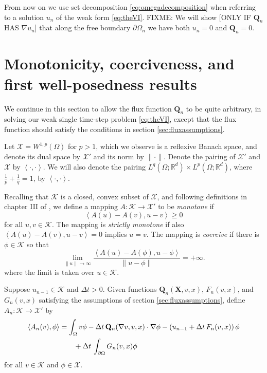 \documentclass[final,leqno,onefignum,onetabnum]{siamltex1213bueler}
\newcommand\bQ{\mathbf{Q}}
\newcommand\bX{\mathbf{X}}
\renewcommand{\grad}{\nabla}
\newcommand{\ip}[2]{\ensuremath{\left<#1,#2\right>}}
\newcommand\RR{\mathbb{R}}
\begin{document}
\medskip
From now on we use set decomposition \eqref{eq:omegadecomposition} when referring to a solution $u_n$ of the weak form \eqref{eq:theVI}.  FIXME:  We will show [ONLY IF $\bQ_n$ HAS $\grad u_n$] that along the free boundary $\partial\Omega_n$ we have both $u_n=0$ and $\bQ_n = 0$.


\section{Monotonicity, coerciveness, and first well-posedness results} \label{sec:mono}

We continue in this section to allow the flux function $\bQ_n$ to be quite arbitrary, in solving our weak single time-step problem \eqref{eq:theVI}, except that the flux function should satisfy the conditions in section \ref{sec:fluxassumptions}.

Let $\mathcal{X} = W^{1,p}(\Omega)$ for $p > 1$, which we observe is a reflexive Banach space, and denote its dual space by $\mathcal{X}'$ and its norm by $\|\cdot\|$.  Denote the pairing of $\mathcal{X}'$ and $\mathcal{X}$ by $\ip{\cdot}{\cdot}$.  We will also denote the pairing $L^q(\Omega;\RR^d) \times L^p(\Omega;\RR^d)$, where $\frac{1}{p}+\frac{1}{q}=1$, by $\ip{\cdot}{\cdot}$.

Recalling that $\mathcal{K}$ is a closed, convex subset of $\mathcal{X}$, and following definitions in chapter III of \cite{KinderlehrerStampacchia}, we define a mapping $A : \mathcal{K} \to \mathcal{X}'$ to be \emph{monotone} if
    $$\ip{A(u) - A(v)}{u-v} \ge 0$$
for all $u,v\in\mathcal{K}$.  The mapping is \emph{strictly monotone} if also $\ip{A(u) - A(v)}{u-v} = 0$ implies $u=v$.  The mapping is \emph{coercive} if there is $\phi\in \mathcal{K}$ so that
    $$\lim_{\|u\|\to\infty} \frac{\ip{A(u) - A(\phi)}{u-\phi}}{\|u-\phi\|} = +\infty.$$
where the limit is taken over $u\in\mathcal{K}$.

\medskip
\newcommand{\An}{A_{n}}
\begin{definition}  Suppose $u_{n-1}\in\mathcal{K}$ and $\Delta t>0$.  Given functions $\bQ_n(\bX,v,x)$, $F_n(v,x)$, and $G_n(v,x)$ satisfying the assumptions of section \ref{sec:fluxassumptions}, define $\An:\mathcal{K} \to \mathcal{X}'$ by
\begin{align}
  \ip{\An(v)}{\phi} &= \int_\Omega v \phi - \Delta t\, \bQ_n(\grad v,v,x) \cdot \grad\phi - \left(u_{n-1} + \Delta t\, F_n(v,x) \right) \phi \label{eq:defineAn} \\
    &\qquad  + \Delta t\,\int_{\partial\Omega} G_n(v,x) \phi  \notag
\end{align}
for all $v \in \mathcal{K}$ and $\phi\in\mathcal{X}$.
\end{definition}
\end{document}
